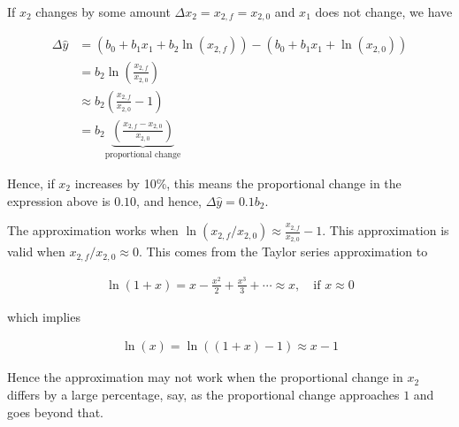 \documentclass[12pt]{article}
\begin{document}
\begin{enumerate}

If $x_2$ changes by some amount $\Delta x_2=x_{2,f}=x_{2,0}$ and $x_1$ does not change, we have

\begin{align*}
	\Delta \hat{y}
	&= (b_0 + b_1 x_1 + b_2 \ln(x_{2,f})) - (b_0 + b_1 x_1 + \ln(x_{2,0}))\\
	&=b_2 \ln \left(
	\frac{x_{2,f}}{x_{2,0}}
	\right)\\
	&\approx b_2 \left(
	\frac{x_{2,f}}{x_{2,0}} - 1
	\right)\\
	&=b_2\underbrace{\left(\frac{x_{2,f} - x_{2,0}}{x_{2,0}}\right)}_{\text{proportional change}}
\end{align*}

Hence, if $x_2$ increases by 10\%, this means the proportional change in the expression
above is $0.10$, and hence, $\Delta\hat{y}=0.1b_2$.


The approximation works when $\ln(x_{2,f}/x_{2,0})\approx \frac{x_{2,f}}{x_{2,0}} - 1$.
This approximation is valid when $x_{2,f}/x_{2,0}\approx 0$. This comes from
the Taylor series approximation to

\begin{align*}
	\ln(1 + x) = x - \frac{x^2}{2} + \frac{x^3}{3} + \cdots \approx x,\quad \text{if } x\approx 0
\end{align*}

which implies

\begin{align*}
	\ln(x) = \ln((1 + x) - 1) \approx x - 1
\end{align*}

Hence the approximation may not work when the proportional change in $x_2$
differs by a large percentage, say, as the proportional change approaches $1$
and goes beyond that.



\end{enumerate}
\end{document}
